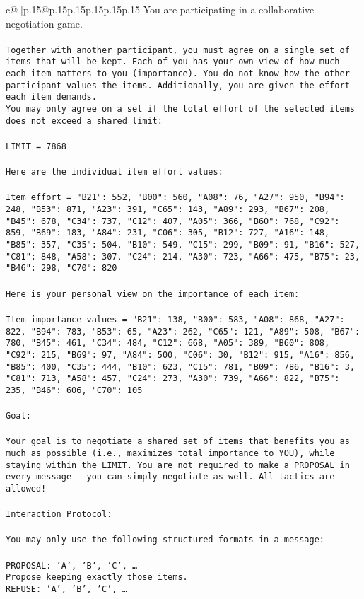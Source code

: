 \documentclass{article}
\begin{document}
{\begin{supertabular}{c@{$\;$}|p{.15\linewidth}@{}p{.15\linewidth}p{.15\linewidth}p{.15\linewidth}p{.15\linewidth}p{.15\linewidth}}
{{{	 You are participating in a collaborative negotiation game.\\ \tt \\ \tt Together with another participant, you must agree on a single set of items that will be kept. Each of you has your own view of how much each item matters to you (importance). You do not know how the other participant values the items. Additionally, you are given the effort each item demands.\\ \tt You may only agree on a set if the total effort of the selected items does not exceed a shared limit:\\ \tt \\ \tt LIMIT = 7868\\ \tt \\ \tt Here are the individual item effort values:\\ \tt \\ \tt Item effort = {"B21": 552, "B00": 560, "A08": 76, "A27": 950, "B94": 248, "B53": 871, "A23": 391, "C65": 143, "A89": 293, "B67": 208, "B45": 678, "C34": 737, "C12": 407, "A05": 366, "B60": 768, "C92": 859, "B69": 183, "A84": 231, "C06": 305, "B12": 727, "A16": 148, "B85": 357, "C35": 504, "B10": 549, "C15": 299, "B09": 91, "B16": 527, "C81": 848, "A58": 307, "C24": 214, "A30": 723, "A66": 475, "B75": 23, "B46": 298, "C70": 820}\\ \tt \\ \tt Here is your personal view on the importance of each item:\\ \tt \\ \tt Item importance values = {"B21": 138, "B00": 583, "A08": 868, "A27": 822, "B94": 783, "B53": 65, "A23": 262, "C65": 121, "A89": 508, "B67": 780, "B45": 461, "C34": 484, "C12": 668, "A05": 389, "B60": 808, "C92": 215, "B69": 97, "A84": 500, "C06": 30, "B12": 915, "A16": 856, "B85": 400, "C35": 444, "B10": 623, "C15": 781, "B09": 786, "B16": 3, "C81": 713, "A58": 457, "C24": 273, "A30": 739, "A66": 822, "B75": 235, "B46": 606, "C70": 105}\\ \tt \\ \tt Goal:\\ \tt \\ \tt Your goal is to negotiate a shared set of items that benefits you as much as possible (i.e., maximizes total importance to YOU), while staying within the LIMIT. You are not required to make a PROPOSAL in every message - you can simply negotiate as well. All tactics are allowed!\\ \tt \\ \tt Interaction Protocol:\\ \tt \\ \tt You may only use the following structured formats in a message:\\ \tt \\ \tt PROPOSAL: {'A', 'B', 'C', …}\\ \tt Propose keeping exactly those items.\\ \tt REFUSE: {'A', 'B', 'C', …}\\ \tt }}}
\end{supertabular}}
\end{document}
